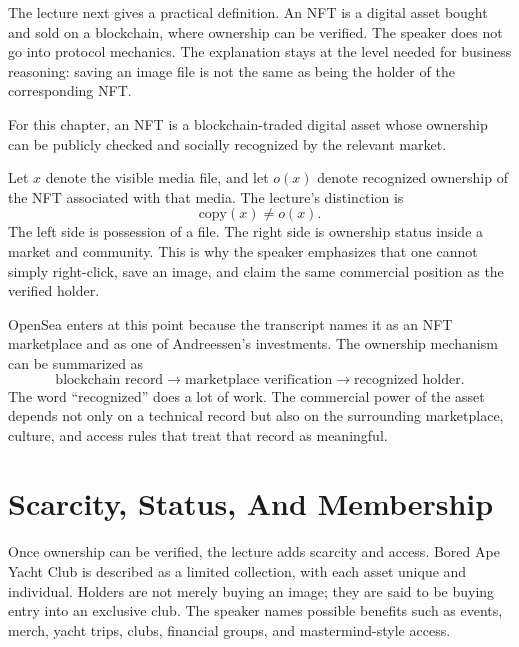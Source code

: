 The lecture next gives a practical definition. An NFT is a digital asset bought and sold on a blockchain, where ownership can be verified. The speaker does not go into protocol mechanics. The explanation stays at the level needed for business reasoning: saving an image file is not the same as being the holder of the corresponding NFT.

\begin{definition}
For this chapter, an NFT is a blockchain-traded digital asset whose ownership can be publicly checked and socially recognized by the relevant market.
\end{definition}

Let \(x\) denote the visible media file, and let \(o(x)\) denote recognized ownership of the NFT associated with that media. The lecture's distinction is
\begin{equation}
\text{copy}(x) \neq o(x).
\end{equation}
The left side is possession of a file. The right side is ownership status inside a market and community. This is why the speaker emphasizes that one cannot simply right-click, save an image, and claim the same commercial position as the verified holder.

OpenSea enters at this point because the transcript names it as an NFT marketplace and as one of Andreessen's investments. The ownership mechanism can be summarized as
\begin{equation}
\text{blockchain record}
\longrightarrow
\text{marketplace verification}
\longrightarrow
\text{recognized holder}.
\end{equation}
The word ``recognized'' does a lot of work. The commercial power of the asset depends not only on a technical record but also on the surrounding marketplace, culture, and access rules that treat that record as meaningful.

\section{Scarcity, Status, And Membership}

Once ownership can be verified, the lecture adds scarcity and access. Bored Ape Yacht Club is described as a limited collection, with each asset unique and individual. Holders are not merely buying an image; they are said to be buying entry into an exclusive club. The speaker names possible benefits such as events, merch, yacht trips, clubs, financial groups, and mastermind-style access.

